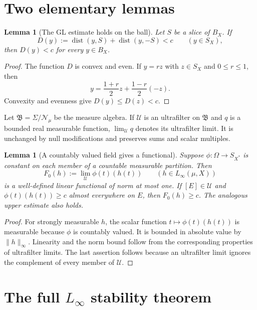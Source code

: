 \documentclass[11pt,a4paper]{article}
\newtheorem{lemma}[theorem]{Lemma}
\newcommand{\dist}{\operatorname{dist}}
\begin{document}
\section{Two elementary lemmas}

\begin{lemma}[The GL estimate holds on the ball]\label{lem:ball}
Let $S$ be a slice of $B_X$.  If
\[
 D(y):=\dist(y,S)+\dist(y,-S)<c\qquad(y\in S_X),
\]
then $D(y)<c$ for every $y\in B_X$.
\end{lemma}

\begin{proof}
The function $D$ is convex and even.  If $y=rz$ with $z\in S_X$ and
$0\le r\le1$, then
\[
 y=\frac{1+r}{2}z+\frac{1-r}{2}(-z).
\]
Convexity and evenness give $D(y)\le D(z)<c$.
\end{proof}

Let $\mathfrak B=\Sigma/\mathcal N_\mu$ be the measure algebra.  If
$\mathcal U$ is an ultrafilter on $\mathfrak B$ and $q$ is a bounded real
measurable function, $\lim_{\mathcal U}q$ denotes its ultrafilter limit.
It is unchanged by null modifications and preserves sums and scalar
multiples.

\begin{lemma}[A countably valued field gives a functional]
\label{lem:functional}
Suppose $\phi:\Omega\to S_{X^*}$ is constant on each member of a countable
measurable partition.  Then
\[
 F_0(h):=\lim_{\mathcal U}\phi(t)(h(t))
 \qquad(h\in L_\infty(\mu,X))
\]
is a well-defined linear functional of norm at most one.  If
$[E]\in\mathcal U$ and $\phi(t)(h(t))\ge c$ almost everywhere on $E$, then
$F_0(h)\ge c$.  The analogous upper estimate also holds.
\end{lemma}

\begin{proof}
For strongly measurable $h$, the scalar function
$t\mapsto\phi(t)(h(t))$ is measurable because $\phi$ is countably valued.
It is bounded in absolute value by $\|h\|_\infty$.  Linearity and the norm
bound follow from the corresponding properties of ultrafilter limits.
The last assertion follows because an ultrafilter limit ignores the
complement of every member of $\mathcal U$.
\end{proof}

\section{The full \texorpdfstring{$L_\infty$}{L-infinity} stability theorem}
\end{document}
